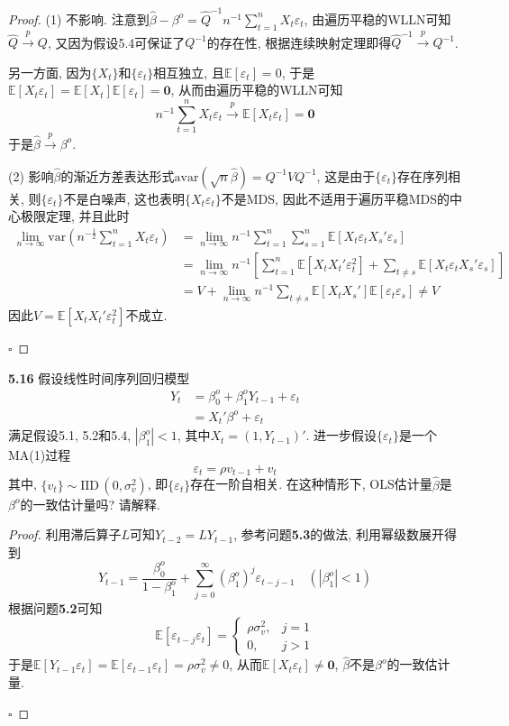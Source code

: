 \documentclass[cn,12pt,math=mtpro2,citestyle=gb7714-2015,bibstyle=gb7714-2015,twocol,mode=simple]{elegantbook}
\newcommand{\E}{\mathbb{E}}
\begin{document}
\begin{proof}
(1) 不影响. 注意到$\displaystyle\hat{\beta}-\beta^o=\hat{Q}^{-1}n^{-1}\sum_{t=1}^{n}X_t\varepsilon_t$, 由遍历平稳的WLLN可知$\hat{Q}\xrightarrow{p}Q$, 又因为假设5.4可保证了$Q^{-1}$的存在性, 根据连续映射定理即得$\hat{Q}^{-1}\xrightarrow{p}Q^{-1}$.

另一方面, 因为$\{X_t\}$和$\{\varepsilon_t\}$相互独立, 且$\E[\varepsilon_t]=0$, 于是$\E[X_t\varepsilon_t]=\E[X_t]\E[\varepsilon_t]=\mathbf{0}$, 从而由遍历平稳的WLLN可知
$$n^{-1}\sum_{t=1}^{n}X_t\varepsilon_t\xrightarrow{p}\E[X_t\varepsilon_t]=\mathbf{0}$$
于是$\hat{\beta}\xrightarrow{p}\beta^o$.

(2) 影响$\hat{\beta}$的渐近方差表达形式$\text{avar}(\sqrt{n}\hat{\beta})=Q^{-1}VQ^{-1}$, 这是由于$\{\varepsilon_t\}$存在序列相关, 则$\{\varepsilon_t\}$不是白噪声, 这也表明$\{X_t\varepsilon_t\}$不是MDS, 因此不适用于遍历平稳MDS的中心极限定理, 并且此时
\begin{align*}
\lim_{n\to\infty}\text{var}\left(n^{-\frac{1}{2}}\sum_{t=1}^{n}X_t\varepsilon_t\right)&=\lim_{n\to\infty}n^{-1}\sum_{t=1}^{n}\sum_{s=1}^{n}\E[X_t\varepsilon_tX_s'\varepsilon_s]  \\
&=\lim_{n\to\infty}n^{-1}\left[\sum_{t=1}^{n}\E[X_tX_t'\varepsilon_t^2]+\sum_{t\neq s}\E[X_t\varepsilon_tX_s'\varepsilon_s]\right] \\
&=V+\lim_{n\to\infty}n^{-1}\sum_{t\neq s}\E[X_tX_s']\E[\varepsilon_t\varepsilon_s]\neq V
\end{align*}
因此$V=\E[X_tX_t'\varepsilon_t^2]$不成立.

$\square$
\end{proof}

\textbf{5.16} 假设线性时间序列回归模型
\begin{align*}
Y_t&=\beta_0^o+\beta_1^oY_{t-1}+\varepsilon_t \\
&=X_t'\beta^o+\varepsilon_t
\end{align*}
满足假设5.1, 5.2和5.4, $|\beta_1^o|<1$, 其中$X_t=(1,Y_{t-1})'$. 进一步假设$\{\varepsilon_t\}$是一个MA(1)过程
$$\varepsilon_t=\rho v_{t-1}+v_t$$
其中, $\{v_t\}\sim \text{IID}\,(0,\sigma_v^2)$, 即$\{\varepsilon_t\}$存在一阶自相关. 在这种情形下, OLS估计量$\hat{\beta}$是$\beta^o$的一致估计量吗? 请解释.

\begin{proof}
利用滞后算子$L$可知$Y_{t-2}=LY_{t-1}$, 参考问题\textbf{5.3}的做法, 利用幂级数展开得到
$$Y_{t-1}=\frac{\beta_0^o}{1-\beta_1^o}+\sum_{j=0}^{\infty}(\beta_1^o)^j\varepsilon_{t-j-1}\quad (|\beta_1^o|<1)$$
根据问题\textbf{5.2}可知
$$\E[\varepsilon_{t-j}\varepsilon_t]=\begin{cases}
                                       \rho\sigma_v^2, &j=1 \\
                                       0, & j>1
                                     \end{cases}$$
于是$\E[Y_{t-1}\varepsilon_t]=\E[\varepsilon_{t-1}\varepsilon_t]=\rho\sigma_v^2\neq0$, 从而$\E[X_t\varepsilon_t]\neq\mathbf{0}$, $\hat{\beta}$不是$\beta^o$的一致估计量.

$\square$
\end{proof}
\end{document}
